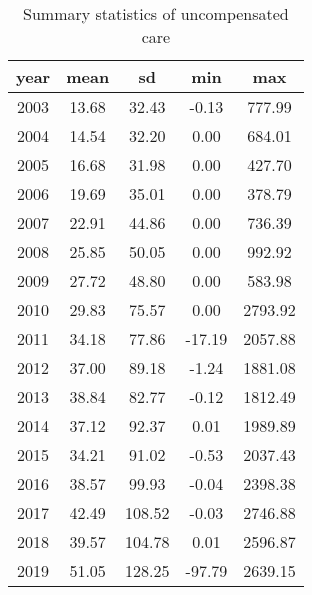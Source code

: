 \begin{table}[ht]
\centering
\begin{tabular}{ccccc}
  \hline
year & mean & sd & min & max \\ 
  \hline
2003 & 13.68 & 32.43 & -0.13 & 777.99 \\ 
  2004 & 14.54 & 32.20 & 0.00 & 684.01 \\ 
  2005 & 16.68 & 31.98 & 0.00 & 427.70 \\ 
  2006 & 19.69 & 35.01 & 0.00 & 378.79 \\ 
  2007 & 22.91 & 44.86 & 0.00 & 736.39 \\ 
  2008 & 25.85 & 50.05 & 0.00 & 992.92 \\ 
  2009 & 27.72 & 48.80 & 0.00 & 583.98 \\ 
  2010 & 29.83 & 75.57 & 0.00 & 2793.92 \\ 
  2011 & 34.18 & 77.86 & -17.19 & 2057.88 \\ 
  2012 & 37.00 & 89.18 & -1.24 & 1881.08 \\ 
  2013 & 38.84 & 82.77 & -0.12 & 1812.49 \\ 
  2014 & 37.12 & 92.37 & 0.01 & 1989.89 \\ 
  2015 & 34.21 & 91.02 & -0.53 & 2037.43 \\ 
  2016 & 38.57 & 99.93 & -0.04 & 2398.38 \\ 
  2017 & 42.49 & 108.52 & -0.03 & 2746.88 \\ 
  2018 & 39.57 & 104.78 & 0.01 & 2596.87 \\ 
  2019 & 51.05 & 128.25 & -97.79 & 2639.15 \\ 
   \hline
\end{tabular}
\caption{Summary statistics of uncompensated care} 
\end{table}
